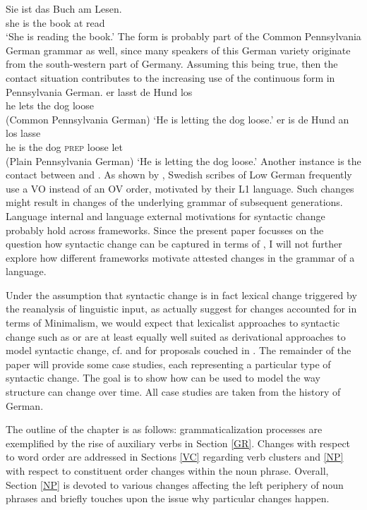 \documentclass[output=paper
	        ,collection
	        ,collectionchapter
 	        ,biblatex
                ,babelshorthands
                ,newtxmath
                ,draftmode
                ,colorlinks, citecolor=brown
]{./langsci/langscibook}
\begin{document}
{\ea
\gll Sie ist das Buch am Lesen. \\ she is the book at read \\
\glt `She is reading the book.'
\z
The form is probably part of the Common Pennsylvania German grammar as well, since many speakers of this German variety originate from the south-western part of Germany. Assuming this being true, then the contact situation contributes to the increasing use of the continuous form in Pennsylvania German.
}      
\eal
\ex
\gll er lasst de Hund los \\ he lets the dog loose \\  \hfill (Common Pennsylvania German)
\glt `He is letting the dog loose.'
\ex
\gll er is de Hund an los lasse \\ he is the dog \textsc{prep} loose let \\  \hfill (Plain Pennsylvania German)
\glt `He is letting the dog loose.'
\zl
Another instance is the contact between  and . As shown by \cite[149]{petzell2016}, Swedish scribes of Low German frequently use a VO instead of an OV order, motivated by their L1 language. Such changes might result in changes of the underlying grammar of subsequent generations. Language internal and language external motivations for syntactic change probably hold across frameworks. Since the present paper focusses on the question how syntactic change can be captured in terms of \hpsg, I will not further explore how different frameworks motivate attested changes in the grammar of a language. 

Under the assumption that syntactic change is in fact lexical change triggered by the reanalysis of linguistic input, as \cite{BiWa2015} actually suggest for changes accounted for in terms of Minimalism, we would expect that lexicalist approaches to syntactic change such as \hpsg or \lfg are at least equally well suited as derivational approaches to model syntactic change, cf. \cite{vincent2001} and \cite{BoVi2017} for proposals couched in \lfg. The remainder of the paper will provide some case studies, each representing a particular type of syntactic change. The goal is to show how \hpsg can be used to model the way structure can change over time. All case studies are taken from the history of German.
 
The outline of the chapter is as follows: grammaticalization processes are exemplified by the rise of auxiliary verbs in Section \ref{GR}. Changes with respect to word order are addressed in Sections \ref{VC} regarding verb clusters and \ref{NP} with respect to constituent order changes within the noun phrase. Overall, Section \ref{NP} is devoted to various changes affecting the left periphery of noun phrases and briefly touches upon the issue why particular changes happen.  
\end{document}

